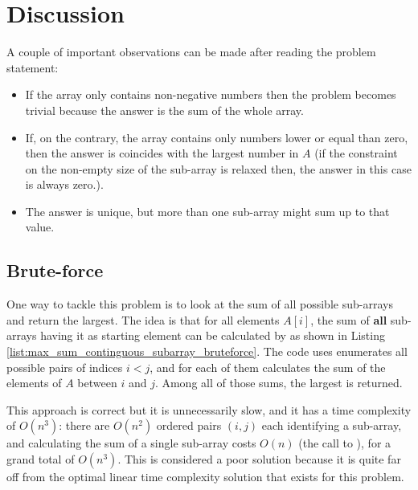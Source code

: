 \section{Discussion}
\label{max_sum_continguous_subarray:sec:discussion}
A couple of important observations can be made after reading the problem statement:
\begin{itemize}
	\item If the array only contains non-negative numbers then the problem becomes trivial because the
	answer is the sum of the whole array.
	\item If, on the contrary, the array contains only  numbers lower or equal than zero, then the answer is
	coincides with the largest number in $A$ (if the constraint on the non-empty size of the sub-array is relaxed then, the answer in this case is always zero.).
	\item The answer is unique, but more than one sub-array might sum up to that value.
\end{itemize}

\subsection{Brute-force}
\label{sec:max_sum_continguous_subarray_bruteforce}
One way to tackle this problem is to look at the sum of all possible sub-arrays and return the largest.
The idea is that for all elements $A[i]$, the sum of \textbf{all} sub-arrays having it as starting
element can be calculated by as shown in Listing
\ref{list:max_sum_continguous_subarray_bruteforce}. The code uses enumerates all possible pairs of indices $i < j$, and for each of them calculates the sum of the elements of $A$ between $i$ and $j$. Among all of those sums, the largest is returned. 

This approach is correct but it is unnecessarily slow, and it has a time complexity of $O(n^3)$: there are $O(n^2)$ ordered pairs $(i,j)$ each identifying a sub-array, and calculating the sum of a single sub-array costs $O(n)$ (the call to ), for a grand total of $O(n^3)$. 
This is considered a poor solution because it is quite far off from the optimal linear time complexity solution that exists for this problem.




